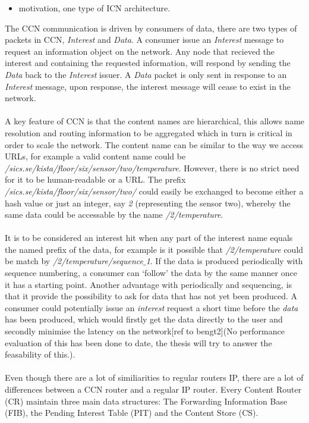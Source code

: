 \begin{itemize}
\item motivation, one type of ICN architecture. 
\end{itemize}
The CCN communication is driven by consumers of data, there are two types of packets in CCN, \textit{Interest} and \textit{Data}. A consumer issue an \textit{Interest} message to request an information object on the network. Any node that recieved the interest and containing the requested information, will respond by sending the \textit{Data} back to the \textit{Interest} issuer. A \textit{Data} packet is only sent in response to an \textit{Interest} message, upon response, the interest message will cease to exist in the network.
\\\\
A key feature of CCN is that the content names are hierarchical, this allows name resolution and routing information to be aggregated which in turn is critical in order to scale the network. The content name can be similar to the way we access URLs, for example a valid content name could be \textit{/sics.se/kista/floor/six/sensor/two/temperature}. However, there is no strict need for it to be human-readable or a URL. The prefix \textit{/sics.se/kista/floor/six/sensor/two/} could easily be exchanged to become either a hash value or just an integer, say \textit{2} (representing the sensor two), whereby the same data could be accessable by the name \textit{/2/temperature}.
\\\\
It is to be considered an interest hit when any part of the interest name equals the named prefix of the data, for example is it possible that \textit{/2/temperature} could be match by \textit{/2/temperature/sequence$\_$1}. If the data is produced periodically with sequence numbering, a consumer can `follow' the data by the same manner once it has a starting point. Another advantage with periodically and sequencing, is that it provide the possibility to ask for data that has not yet been produced. A consumer could potentially issue an \textit{interest} request a short time before the \textit{data} has been produced, which would firstly get the data directly to the user and secondly minimise the latency on the network[ref to bengt2](No performance evaluation of this has been done to date, the thesis will try to answer the feasability of this.). 
\\\\
Even though there are a lot of similiarities to regular routers IP, there are a lot of differences between a CCN router and a regular IP router.
Every Content Router (CR) maintain three main data structures: The Forwarding Information Base (FIB), the Pending Interest Table (PIT) and the Content Store (CS).

